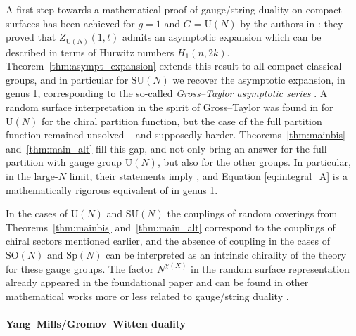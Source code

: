 \documentclass[11pt,a4paper,reqno]{article}
\theoremstyle{definition}
\theoremstyle{remark}
\newcommand\SU{{\mathrm{SU}}}
\newcommand\SO{{\mathrm{SO}}}
\newcommand\Sp{{\mathrm{Sp}}}
\newcommand\U{{\mathrm U}}
\begin{document}
A first step towards a mathematical proof of gauge/string duality on compact surfaces has been achieved for $g=1$ and $G=\U(N)$ by the authors in \cite[Theorem 1.2]{LM2}: they proved that $Z_{\U(N)}(1,t)$ admits an asymptotic expansion which can be described in terms of Hurwitz numbers $H_1(n,2k)$. Theorem~\ref{thm:asympt_expansion} extends this result to all compact classical groups, and in particular for $\SU(N)$ we recover the asymptotic expansion, in genus 1, corresponding to the so-called \emph{Gross--Taylor asymptotic series} \cite[Eq. (2.2)]{CMR}. A random surface interpretation in the spirit of Gross--Taylor was found in \cite[Corollary 6.2]{LM2} for $\U(N)$ for the chiral partition function, but the case of the full partition function remained unsolved -- and supposedly harder. Theorems~\ref{thm:mainbis} and~\ref{thm:main_alt} fill this gap, and not only bring an answer for the full partition with gauge group $\U(N)$, but also for the other groups. In particular, in the large-$N$ limit, their statements imply \cite[Theorem 1]{Dij}, and Equation \eqref{eq:integral_A} is a mathematically rigorous equivalent of \cite[Eq. (3.6)]{GT2} in genus 1.

In the cases of $\U(N)$ and $\SU(N)$ the couplings of random coverings from Theorems~\ref{thm:mainbis} and~\ref{thm:main_alt} correspond to the couplings of chiral sectors mentioned earlier, and the absence of coupling in the cases of $\SO(N)$ and $\Sp(N)$ can be interpreted as an intrinsic chirality of the theory for these gauge groups. The factor $N^{\chi(X)}$ in the random surface representation already appeared in the foundational paper \cite{Hoo74} and can be found in other mathematical works more or less related to gauge/string duality \cite{PPSY,CPS}.



\paragraph{Yang--Mills/Gromov--Witten duality}
\end{document}
